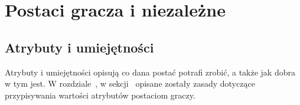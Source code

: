 \chapter{Postaci gracza i niezależne}
\label{ch:character}

\section{Atrybuty i umiejętności}
Atrybuty i umiejętności opisują co dana postać potrafi zrobić, a także jak dobra
w tym jest. W rozdziale~, w
sekcji~ opisane zostały zasady dotyczące
przypisywania wartości atrybutów postaciom graczy.













